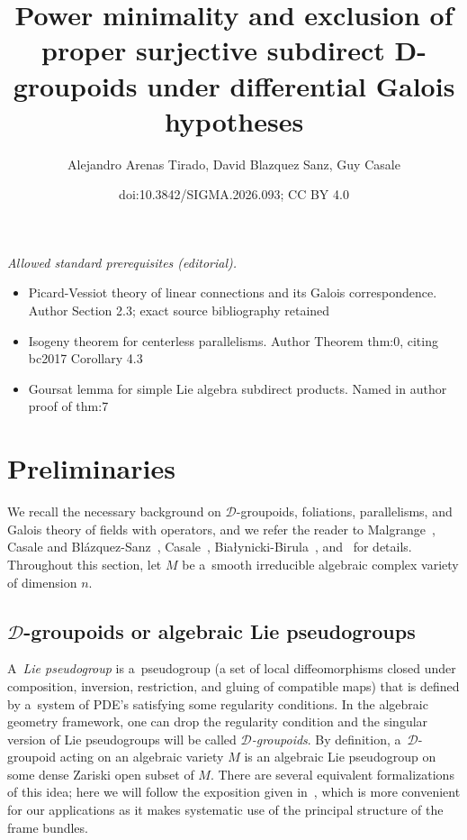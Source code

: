 \documentclass[10pt,a4paper]{amsart}
\title{Power minimality and exclusion of proper surjective subdirect D-groupoids under differential Galois hypotheses}
\author{Alejandro Arenas Tirado, David Blazquez Sanz, Guy Casale}
\date{doi:10.3842/SIGMA.2026.093; CC BY 4.0}
\numberwithin{equation}{section}
\theoremstyle{definition}
\begin{document}
\maketitle
\noindent\textit{Allowed standard prerequisites (editorial).}\begin{itemize}
\item Picard-Vessiot theory of linear connections and its Galois correspondence. Author Section 2.3; exact source bibliography retained
\item Isogeny theorem for centerless parallelisms. Author Theorem thm:0, citing bc2017 Corollary 4.3
\item Goursat lemma for simple Lie algebra subdirect products. Named in author proof of thm:7
\end{itemize}\medskip
\section{Preliminaries}

We recall the necessary background on $\mathcal{D}$-groupoids, foliations, parallelisms, and Galois theory of fields with operators, and we refer the reader to Malgrange~\cite{malgrange2012leon}, Casale and Bl\'azquez-Sanz~\cite{bc2017}, Casale~\cite{Casale2004SurLG}, Bia{\l}ynicki-Birula~\cite{bialynicki1962galois}, and~\cite{Casale_BlazquezSanz_ArenasTirado_2025} for details. Throughout this section, let $M$ be a~smooth irreducible algebraic complex variety of dimension $n$.

\subsection[D-groupoids or algebraic Lie pseudogroups]{$\boldsymbol{\mathcal{D}}$-groupoids or algebraic Lie pseudogroups}

 A~\textit{Lie pseudogroup} is a~pseudogroup (a set of local diffeomorphisms closed under composition, inversion, restriction, and gluing of compatible maps) that is defined by a~system of PDE's satisfying some regularity conditions. In the algebraic geometry framework, one can drop the regularity condition and the singular version of Lie pseudogroups will be called \textit{$ \mathcal D$-groupoids}. By definition, a~$\mathcal D$-groupoid acting on an algebraic variety $M$ is an algebraic Lie pseudogroup on some dense Zariski open subset of $M$. There are several equivalent formalizations of this idea; here we will follow the exposition given in~\cite[Section 2]{bcd2022malgrange}, which is more convenient for our applications as it makes systematic use of the principal structure of the frame bundles.
\end{document}
